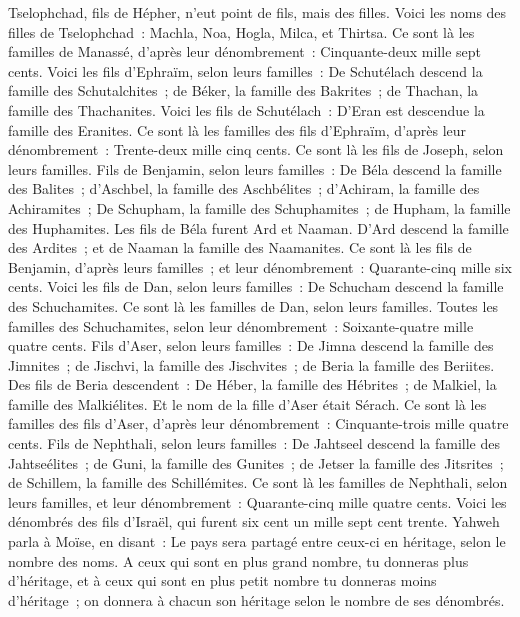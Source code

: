 \begin{multicols}{2}
Tselophchad, fils de Hépher, n'eut point de fils, mais des filles. Voici les noms des filles de Tselophchad~: Machla, Noa, Hogla, Milca, et Thirtsa.
Ce sont là les familles de Manassé, d'après leur dénombrement~: Cinquante-deux mille sept cents.
Voici les fils d'Ephraïm, selon leurs familles~: De Schutélach descend la famille des Schutalchites~; de Béker, la famille des Bakrites~; de Thachan, la famille des Thachanites.
Voici les fils de Schutélach~: D'Eran est descendue la famille des Eranites.
Ce sont là les familles des fils d'Ephraïm, d'après leur dénombrement~: Trente-deux mille cinq cents. Ce sont là les fils de Joseph, selon leurs familles.
Fils de Benjamin, selon leurs familles~: De Béla descend la famille des Balites~; d'Aschbel, la famille des Aschbélites~; d'Achiram, la famille des Achiramites~;
De Schupham, la famille des Schuphamites~; de Hupham, la famille des Huphamites.
Les fils de Béla furent Ard et Naaman. D'Ard descend la famille des Ardites~; et de Naaman la famille des Naamanites.
Ce sont là les fils de Benjamin, d'après leurs familles~; et leur dénombrement~: Quarante-cinq mille six cents.
Voici les fils de Dan, selon leurs familles~: De Schucham descend la famille des Schuchamites. Ce sont là les familles de Dan, selon leurs familles.
Toutes les familles des Schuchamites, selon leur dénombrement~: Soixante-quatre mille quatre cents.
Fils d'Aser, selon leurs familles~: De Jimna descend la famille des Jimnites~; de Jischvi, la famille des Jischvites~; de Beria la famille des Beriites.
Des fils de Beria descendent~: De Héber, la famille des Hébrites~; de Malkiel, la famille des Malkiélites.
Et le nom de la fille d'Aser était Sérach.
Ce sont là les familles des fils d'Aser, d'après leur dénombrement~: Cinquante-trois mille quatre cents.
Fils de Nephthali, selon leurs familles~: De Jahtseel descend la famille des Jahtseélites~; de Guni, la famille des Gunites~;
de Jetser la famille des Jitsrites~; de Schillem, la famille des Schillémites.
Ce sont là les familles de Nephthali, selon leurs familles, et leur dénombrement~: Quarante-cinq mille quatre cents.
Voici les dénombrés des fils d'Israël, qui furent six cent un mille sept cent trente.
Yahweh parla à Moïse, en disant~:
Le pays sera partagé entre ceux-ci en héritage, selon le nombre des noms.
A ceux qui sont en plus grand nombre, tu donneras plus d'héritage, et à ceux qui sont en plus petit nombre tu donneras moins d'héritage~; on donnera à chacun son héritage selon le nombre de ses dénombrés.

\end{multicols}
